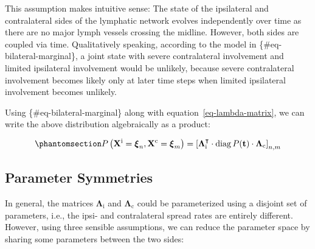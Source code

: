 \documentclass[
  sn-mathphys-num,
]{sn-jnl}
\begin{document}
This assumption makes intuitive sense: The state of the ipsilateral and
contralateral sides of the lymphatic network evolves independently over
time as there are no major lymph vessels crossing the midline. However,
both sides are coupled via time. Qualitatively speaking, according to
the model in \{\#eq-bilateral-marginal\}, a joint state with severe
contralateral involvement and limited ipsilateral involvement would be
unlikely, because severe contralateral involvement becomes likely only
at later time steps when limited ipsilateral involvement becomes
unlikely.

Using \{\#eq-bilateral-marginal\} along with
equation~\ref{eq-lambda-matrix}, we can write the above distribution
algebraically as a product:

\begin{equation}\phantomsection\label{eq-bilateral-marginal-algebra}{
P \left( \mathbf{X}^\text{i} = \boldsymbol{\xi}_n, \mathbf{X}^\text{c} = \boldsymbol{\xi}_m \right) = \left[ \boldsymbol{\Lambda}^\intercal_\text{i} \cdot \operatorname{diag} P(\mathbf{t}) \cdot \boldsymbol{\Lambda}_\text{c} \right]_{n,m}
}\end{equation}

\subsection{Parameter Symmetries}\label{sec-params-symmetry}

In general, the matrices \(\boldsymbol{\Lambda}_\text{i}\) and
\(\boldsymbol{\Lambda}_\text{c}\) could be parameterized using a
disjoint set of parameters, i.e., the ipsi- and contralateral spread
rates are entirely different. However, using three sensible assumptions,
we can reduce the parameter space by sharing some parameters between the
two sides:
\end{document}
